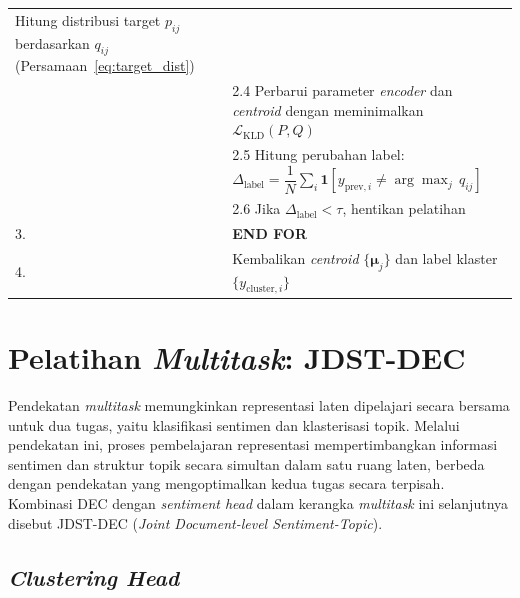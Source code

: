 \begin{table}[H]
\begin{tabular}{p{} p{}}
     Hitung distribusi target $p_{ij}$ berdasarkan $q_{ij}$
     (Persamaan~\ref{eq:target_dist}) \\[3pt]
   & \hspace{1em} 2.4 \hspace{0.5em}
     Perbarui parameter \textit{encoder} dan \textit{centroid}
     dengan meminimalkan
     $\mathcal{L}_{\text{KLD}}(P, Q)$ \\[3pt]
   & \hspace{1em} 2.5 \hspace{0.5em}
     Hitung perubahan label:
     $\Delta_{\text{label}} = \dfrac{1}{N}\displaystyle\sum_i
     \mathbf{1}[y_{\text{prev},i} \neq \arg\max_j\, q_{ij}]$ \\[8pt]
   & \hspace{1em} 2.6 \hspace{0.5em}
     Jika $\Delta_{\text{label}} < \tau$, hentikan pelatihan \\[3pt]
3. & \textbf{END FOR} \\[3pt]
4. & Kembalikan \textit{centroid} $\{\boldsymbol{\mu}_j\}$ dan
     label klaster $\{y_{\text{cluster},i}\}$ \\
\hline
\end{tabular}
\end{table}

\section{Pelatihan \textit{Multitask}: JDST-DEC}

Pendekatan \textit{multitask} memungkinkan representasi laten dipelajari
secara bersama untuk dua tugas, yaitu klasifikasi sentimen dan
klasterisasi topik. Melalui pendekatan ini, proses pembelajaran
representasi mempertimbangkan informasi sentimen dan struktur topik
secara simultan dalam satu ruang laten, berbeda dengan pendekatan yang
mengoptimalkan kedua tugas secara terpisah. Kombinasi DEC dengan
\textit{sentiment head} dalam kerangka \textit{multitask} ini
selanjutnya disebut JDST-DEC (\textit{Joint Document-level Sentiment-Topic}).

\subsection{\textit{Clustering Head}}

